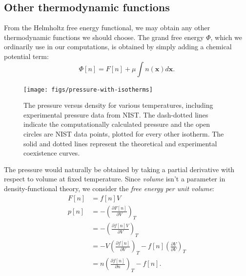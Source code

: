 \documentclass[letterpaper,twocolumn,amsmath,amssymb,prb]{revtex4-1}
\newcommand{\xx}{\textbf{x}}
\begin{document}
\subsection{Other thermodynamic functions}

From the Helmholtz free energy functional, we may obtain any other
thermodynamic functions we should choose.  The grand free energy
$\Phi$, which we ordinarily use in our computations, is obtained by
simply adding a chemical potential term:
\begin{equation}
  \Phi[n] = F[n] + \mu \int n(\xx) d\xx.
\end{equation}

\begin{figure}
\begin{center}
\texttt{[image: figs/pressure-with-isotherms]}
\end{center}
\caption{The pressure versus density for various temperatures, including
experimental pressure data from NIST\cite{nistwater}. The dash-dotted lines
indicate the computationally calculated pressure and the open circles are 
NIST data points, plotted for every other isotherm. The solid and dotted lines
represent the theoretical and experimental coexistence curves.}
\label{fig:pressure-with-isotherms}
\end{figure}

The pressure would naturally be obtained by taking a partial
derivative with respect to volume at fixed temperature.  Since
\emph{volume} isn't a parameter in density-functional theory, we
consider the \emph{free energy per unit volume}:
\begin{align}
  F[n] &= f[n]V \\
  p[n] &= -\left(\frac{\partial F[n]}{\partial V}\right)_{T} \\
  &= -\left(\frac{\partial f[n]V}{\partial V}\right)_{T} \\
  &= -V\left(\frac{\partial f[n]}{\partial V}\right)_{T}
   - f[n]\left(\frac{\partial V}{\partial V}\right)_{T} \\
  &= n \left(\frac{\partial f[n]}{\partial n}\right)_{T} - f[n].
\end{align}
\end{document}
